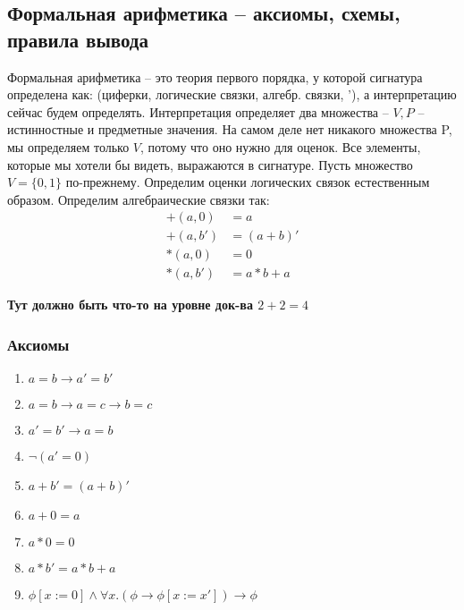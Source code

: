 \subsection{Формальная арифметика -- аксиомы, схемы, правила вывода}
\label{sec-9-3}
Формальная арифметика -- это теория первого порядка, у которой
сигнатура определена как: (циферки, логические связки, алгебр.
связки, '), а интерпретацию сейчас будем определять.
Интерпретация определяет два множества -- $V, P$ -- истинностные и
предметные значения. На самом деле нет никакого множества P,
мы определяем только $V$, потому что оно нужно для оценок. Все
элементы, которые мы хотели бы видеть, выражаются в сигнатуре.
Пусть множество $V = \lbrace 0, 1 \rbrace$ по-прежнему.
Определим оценки логических связок естественным образом.
Определим алгебраические связки так:
\begin{align*}
    +(a, 0 ) &= a \\
    +(a, b') &= (a + b)' \\
    *(a, 0 ) &= 0 \\
    *(a, b') &= a * b + a
\end{align*}

\textbf{Тут должно быть что-то на уровне док-ва $2+2=4$}
\subsubsection{Аксиомы}
\label{sec-9-3-1}
\begin{enumerate}
\item $a = b \to a' = b'$
\item $a = b \to a = c \to b = c$
\item $a' = b' \to a = b$
\item $\lnot (a' = 0)$
\item $a + b' = (a + b)'$
\item $a + 0 = a$
\item $a * 0 = 0$
\item $a * b' = a * b + a$
\item $\phi[x:=0] \land \forall x.(\phi \to \phi[x:=x']) \to \phi$
\end{enumerate}
